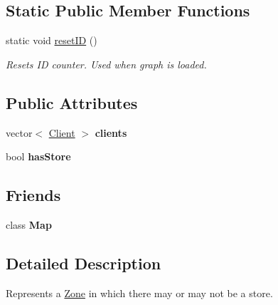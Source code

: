 \subsection*{Static Public Member Functions}
\begin{DoxyCompactItemize}
\item 
\hypertarget{classZone_a334033d0188c5ad5d79e1940e468a667}{static void \hyperlink{classZone_a334033d0188c5ad5d79e1940e468a667}{reset\-I\-D} ()}\label{classZone_a334033d0188c5ad5d79e1940e468a667}

\begin{DoxyCompactList}\small\item\em Resets I\-D counter. Used when graph is loaded. \end{DoxyCompactList}\end{DoxyCompactItemize}
\subsection*{Public Attributes}
\begin{DoxyCompactItemize}
\item 
\hypertarget{classZone_a6a9280bd93f5f5edd83c57cec77fdcd6}{vector$<$ \hyperlink{classClient}{Client} $>$ {\bfseries clients}}\label{classZone_a6a9280bd93f5f5edd83c57cec77fdcd6}

\item 
\hypertarget{classZone_a2a23da1e70eea3831a0fa1901e47e342}{bool {\bfseries has\-Store}}\label{classZone_a2a23da1e70eea3831a0fa1901e47e342}

\end{DoxyCompactItemize}
\subsection*{Friends}
\begin{DoxyCompactItemize}
\item 
\hypertarget{classZone_ad2f32e921244459f7cc6d50355429cc6}{class {\bfseries Map}}\label{classZone_ad2f32e921244459f7cc6d50355429cc6}

\end{DoxyCompactItemize}


\subsection{Detailed Description}
Represents a \hyperlink{classZone}{Zone} in which there may or may not be a store. 

